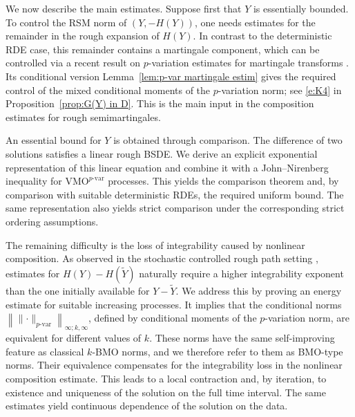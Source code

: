 \documentclass[11pt,reqno]{amsart}
\numberwithin{equation}{section}
\begin{document}
We now describe the main estimates. Suppose first that $Y$ is essentially
bounded. To control the RSM norm of $(Y,-H(Y))$, one needs estimates for the
remainder in the rough expansion of $H(Y)$. In contrast to the deterministic
RDE case, this remainder contains a martingale component, which can be controlled via a recent result on $p$-variation estimates for martingale transforms \cite{friz2023rough}. Its conditional version Lemma~\ref{lem:p-var martingale estim} gives the
required control of the mixed conditional moments of the $p$-variation
norm; see \eqref{e:K4} in Proposition~\ref{prop:G(Y) in D}. This is the main
input in the composition estimates for rough semimartingales.



An essential bound for $Y$ is obtained through comparison. The difference
of two solutions satisfies a linear rough BSDE. We derive an explicit
exponential representation of this linear equation and combine it with a
John--Nirenberg inequality for $\mathrm{VMO}^{p\text{-var}}$ processes. This yields the comparison theorem and, by comparison with suitable deterministic
RDEs, the required uniform bound. The same representation also yields strict
comparison under the corresponding strict ordering assumptions.

The remaining difficulty is the loss of integrability caused by nonlinear
composition. As observed in the stochastic controlled rough path setting
\cite{fhl21}, estimates for $H(Y)-H(\widetilde Y)$ naturally require a
higher integrability exponent than the one initially available for
$Y-\widetilde Y$. We address this by proving an energy estimate for suitable
increasing processes. It implies that the conditional norms $\left\|
\|\bm\cdot\|_{p\text{-}\mathrm{var}}
\right\|_{\infty;k,\infty}$, 
defined by conditional moments of the $p$-variation norm, are equivalent
for different values of $k$. These norms have the same self-improving
feature as classical $k$-\textrm{BMO} norms, and we therefore refer to them
as \textrm{BMO}-type norms. Their equivalence compensates for the
integrability loss in the nonlinear composition estimate. This leads to a
local contraction and, by iteration, to existence and uniqueness of the solution on the
full time interval. The same estimates yield continuous dependence of the
solution on the data.
\end{document}
